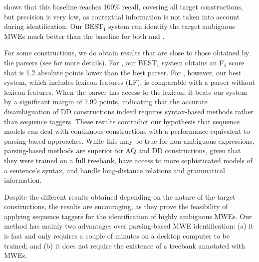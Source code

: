 \documentclass[output=paper,modfonts]{langscibook}
\begin{document}
 shows that this baseline reaches 100\% recall, covering all target constructions, but precision is very low, as contextual information is not taken into account during identification.
Our \textsc{BEST$_1$} system can identify the target ambiguous MWEs much better than the baseline for both \fullAQ{} and \fullDD{}.

For some constructions, we do obtain results that are close to those obtained by the parsers (see  for more details). For \fullAQ{}, our \textsc{BEST$_1$} system obtains an F$_1$ score that is 1.2 absolute points lower than the best parser. For \fullDD{}, however, our best system, which includes lexicon features (LF), is comparable with a parser without lexicon features. When the parser has access to the lexicon, it beats our system by a significant margin of 7.99 points, indicating that the accurate disambiguation of DD constructions indeed requires syntax-based methods rather than sequence taggers. These results contradict our hypothesis that sequence models can deal with continuous constructions with a performance equivalent to parsing-based approaches. While this may be true for non-ambiguous expressions, parsing-based methods are superior for AQ and DD constructions, given that they were trained on a full treebank, have access to more sophisticated models of a sentence's syntax, and handle long-distance relations and grammatical information.

Despite the different results obtained depending on the nature of the target constructions, the results are encouraging, as they prove the feasibility of applying sequence taggers for the identification of highly ambiguous MWEs. Our method has mainly two advantages over parsing-based MWE identification: (a) it is fast and only requires a couple of minutes on a desktop computer to be trained; and (b) it does not require the existence of a treebank annotated with MWEs.
\end{document}
